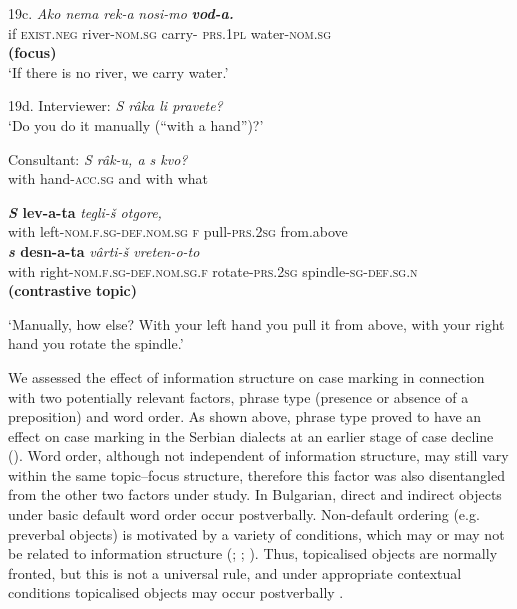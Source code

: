 \documentclass[output=paper]{langscibook}
\begin{document}
19c.  \textit{Ako   nema         rek-a}                  \textit{nosi-mo} \textbf{\textit{vod-a.}}\\
         if      \textsc{exist.neg}    river-\textsc{nom.sg}  carry- \textsc{prs.}1\textsc{pl}     water-\textsc{nom.sg}\\
                                                                                 \textbf{(focus)}\\
         ‘If there is no river, we carry water.’

19d.  Interviewer: \textit{S râka li pravete?}\\
                                  ‘Do you do it manually (“with a hand”)?’

           Consultant: \textit{S       râk-u,              a        s       kvo?} \\
                               with  hand-\textsc{acc.sg}   and    with what

                               \textbf{\textit{S}       \textbf{lev-a-ta}} \textit{tegli-š              otgore,} \\
                               with left-\textsc{nom.f.sg-def.nom.sg} \textsc{f}  pull-\textsc{prs.2sg}    from.above                                               \\
                                \textbf{\textit{s}        \textbf{desn-a-ta}} \textit{vârti-š                 vreten-o-to}\\
                                with right-\textsc{nom.f.sg-def.nom.sg.f}   rotate-\textsc{prs.2sg}   spindle-\textsc{sg-def.sg.n}\\
                                      \textbf{(contrastive} \textbf{topic)}

 ‘Manually, how else? With your left hand you pull it from above, with your right hand you rotate the spindle.’ 

We assessed the effect of information structure on case marking in connection with two potentially relevant factors, phrase type (presence or absence of a preposition) and word order. As shown above, phrase type proved to have an effect on case marking in the Serbian dialects at an earlier stage of case decline (). Word order, although not independent of information structure, may still vary within the same topic–focus structure, therefore this factor was also disentangled from the other two factors under study. In Bulgarian, direct and indirect objects under basic default word order occur postverbally. Non-default ordering (e.g. preverbal objects) is motivated by a variety of conditions, which may or may not be related to information structure (\citealt{Georgieva1974}; \citealt{Georgieva1983}; \citealt{Dyer1992}). Thus, topicalised objects are normally fronted, but this is not a universal rule, and under appropriate contextual conditions topicalised objects may occur postverbally . 
\end{document}
